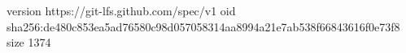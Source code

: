 version https://git-lfs.github.com/spec/v1
oid sha256:de480c853ea5ad76580c98d057058314aa8994a21e7ab538f66843616f0e73f8
size 1374
